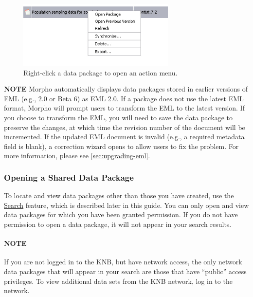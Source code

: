 \begin{figure}
  \centering
    \includegraphics[width=0.7\textwidth]{images/menu-dp-rightclick.jpg}
  \caption{Right-click a data package to open an action menu.}
  \label{fig:menu-dp-rightclick}
\end{figure}

\begin{shaded}
  \textbf{NOTE} Morpho automatically displays data packages stored in
  earlier versions of EML (e.g., 2.0 or Beta 6) as EML 2.0. If a package
  does not use the latest EML format, Morpho will prompt users to
  transform the EML to the latest version. If you choose to transform
  the EML, you will need to save the data package to preserve the
  changes, at which time the revision number of the document will be
  incremented. If the updated EML document is invalid (e.g., a required
  metadata field is blank), a correction wizard opens to allow users to
  fix the problem. For more information, please see
  \autoref{sec:upgrading-eml}.
\end{shaded}

\subsubsection*{Opening a Shared Data Package}

To locate and view data packages other than those you have created, use
the \hyperref[sec:searching]{Search} feature, which is described later
in this guide. You can only open and view data packages for which you
have been granted permission. If you do not have permission to open a
data package, it will not appear in your search results. 

\paragraph{NOTE}
If you are not logged in to the KNB, but have network access, the only
network data packages that will appear in your search are those that
have ``public'' access privileges. To view additional data sets from the
KNB network, log in to the network.

